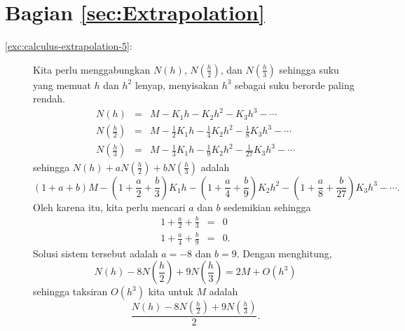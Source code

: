 \section*{Bagian \ref{sec:Extrapolation}}
\begin{description}
\item [{\ref{exc:calculus-extrapolation-5}:}] Kita perlu menggabungkan
$N(h)$, $N(\frac{h}{2})$, dan $N(\frac{h}{3})$ sehingga suku yang
memuat $h$ dan $h^{2}$ lenyap, menyisakan $h^{3}$ sebagai suku
berorde paling rendah.
\begin{eqnarray*}
N(h) & = & M-K_{1}h-K_{2}h^{2}-K_{3}h^{3}-\cdots\\
N\left(\frac{h}{2}\right) & = & M-\frac{1}{2}K_{1}h-\frac{1}{4}K_{2}h^{2}-\frac{1}{8}K_{3}h^{3}-\cdots\\
N\left(\frac{h}{3}\right) & = & M-\frac{1}{3}K_{1}h-\frac{1}{9}K_{2}h^{2}-\frac{1}{27}K_{3}h^{3}-\cdots
\end{eqnarray*}
sehingga $N(h)+aN(\frac{h}{2})+bN(\frac{h}{3})$ adalah
\[
(1+a+b)M-\left(1+\frac{a}{2}+\frac{b}{3}\right)K_{1}h-\left(1+\frac{a}{4}+\frac{b}{9}\right)K_{2}h^{2}-\left(1+\frac{a}{8}+\frac{b}{27}\right)K_{3}h^{3}-\cdots.
\]
Oleh karena itu, kita perlu mencari $a$ dan $b$ sedemikian sehingga
\begin{eqnarray*}
1+\frac{a}{2}+\frac{b}{3} & = & 0\\
1+\frac{a}{4}+\frac{b}{9} & = & 0.
\end{eqnarray*}
Solusi sistem tersebut adalah $a=-8$ dan $b=9$. Dengan menghitung,
\[
N(h)-8N\left(\frac{h}{2}\right)+9N\left(\frac{h}{3}\right)=2M+O(h^{3})
\]
sehingga taksiran $O(h^{3})$ kita untuk $M$ adalah
\[
\frac{N(h)-8N(\frac{h}{2})+9N(\frac{h}{3})}{2}.
\]


\end{description}
